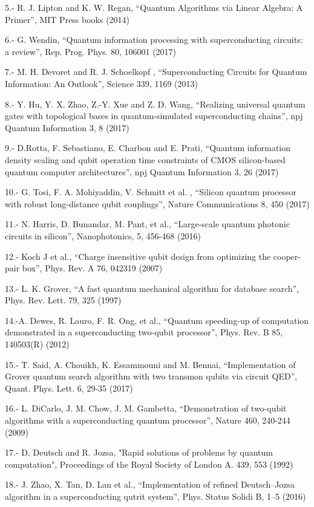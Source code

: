 5.- R. J. Lipton and K. W. Regan, “Quantum Algorithms via Linear Algebra: A Primer”, MIT Press books (2014)

6.- G. Wendin, “Quantum information processing with superconducting circuits: a review”, Rep. Prog.  Phys. 80, 106001 (2017)

7.- M. H. Devoret and R. J. Schoelkopf , “Superconducting Circuits for Quantum Information: An Outlook”, Science 339, 1169 (2013)

8.- Y. Hu, Y. X. Zhao, Z.-Y. Xue and Z. D. Wang, “Realizing universal quantum gates with topological bases in quantum-simulated superconducting chains”, npj Quantum Information 3, 8 (2017)

9.- D.Rotta, F. Sebastiano, E. Charbon and E. Prati, “Quantum information density scaling and qubit operation time constraints of CMOS silicon-based quantum computer architectures”, npj Quantum Information 3, 26 (2017)

10.- G. Tosi, F. A. Mohiyaddin, V. Schmitt et al. , “Silicon quantum processor with robust long-distance qubit couplings”, Nature Communications 8, 450 (2017)

11.- N. Harris, D. Bunandar, M. Pant, et al., “Large-scale quantum photonic circuits in silicon”, Nanophotonics, 5, 456-468 (2016)

12.- Koch J et al., “Charge insensitive qubit design from optimizing the cooper-pair box”, Phys. Rev. A 76, 042319 (2007)

13.- L. K. Grover, “A fast quantum mechanical algorithm for database search”, Phys. Rev. Lett. 79, 325 (1997)


14.-A. Dewes, R. Lauro, F. R. Ong, et al., “Quantum speeding-up of computation demonstrated in a superconducting two-qubit processor”, Phys. Rev. B 85, 140503(R) (2012)

15.- T. Said, A. Chouikh, K. Essammouni and M. Bennai, “Implementation of Grover quantum search algorithm with two transmon qubits via circuit QED”, Quant. Phys. Lett. 6, 29-35 (2017)

16.- L. DiCarlo, J. M. Chow, J. M. Gambetta, “Demonstration of two-qubit algorithms with a superconducting quantum processor”, Nature 460, 240-244 (2009)

17.- D. Deutsch and R. Jozsa, "Rapid solutions of problems by quantum computation", Proceedings of the Royal Society of London A. 439, 553 (1992)

18.- J. Zhao, X. Tan, D. Lan et al., “Implementation of refined Deutsch–Jozsa algorithm in a superconducting qutrit system”, Phys. Status Solidi B, 1–5 (2016)

